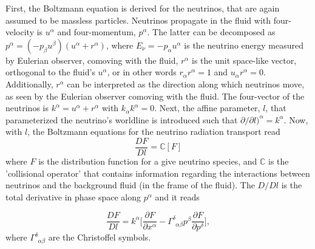 First, the Boltzmann equation is derived for the neutrinos, that are again assumed to be massless 
particles. Neutrinos propagate in the fluid with four-velocity is $u^{\alpha}$ and four-momentum, $p^{\alpha}$.
The latter can be decomposed as \citep{Thorne:1981}
%
$p^{\alpha} = (-p_{\beta}u^{\beta})(u^{\alpha} + r^{\alpha})$, 
%
where $E_{\nu}=-p_{\alpha}u^{\alpha}$ is the neutrino energy measured by Eulerian observer,
comoving with the fluid, $r^{\alpha}$ is the unit space-like vector, orthogonal to the 
fluid's $u^{\alpha}$, or in other words $r_{\alpha}r^{\alpha}=1$ and $u_{\alpha}r^{\alpha}=0$.
%
Additionally, $r^{\alpha}$ can be interpreted as the direction along which neutrinos move,
as seen by the Eulerian observer comoving with the fluid.
%
The four-vector of the neutrinos is
%
$k^{\alpha} = u^{\alpha} + r^{\alpha}$ 
%
with $k_{\alpha}k^{\alpha} = 0$.
%
Next, the affine parameter, $l$, that parameterized the neutrino's worldline is introduced
%
% 
such that $\partial / \partial l)^{\alpha} = k^{\alpha}$.
%
Now, with $l$, the Boltzmann equations for the neutrino radiation transport read \citep{Thorne:1981}
%
\begin{equation*}
\frac{D F}{D l} = \mathbb{C}[F]
\end{equation*}
%
where $F$ is the distribution function for a give neutrino species, and $\mathbb{C}$ is the
'collisional operator' that contains information regarding the interactions 
between neutrinos and the background fluid (in the frame of the fluid). 
%
The $D/Dl$ is the total derivative in phase space along $p^{\alpha}$ and it reads 

\begin{equation}
\label{eq:method:whisky:neut:bolzeq}
\frac{DF}{Dl} = k^{\alpha} \Big[ \frac{\partial F}{\partial x^{\alpha}} - \Gamma^{\delta}_{\:\:\alpha\beta}p^{\beta}\frac{\partial F}{\partial p^{\delta}} \Big],
\end{equation}
%
where $\Gamma^{\delta}_{\:\:\alpha\beta}$ are the Christoffel symbols.
%

